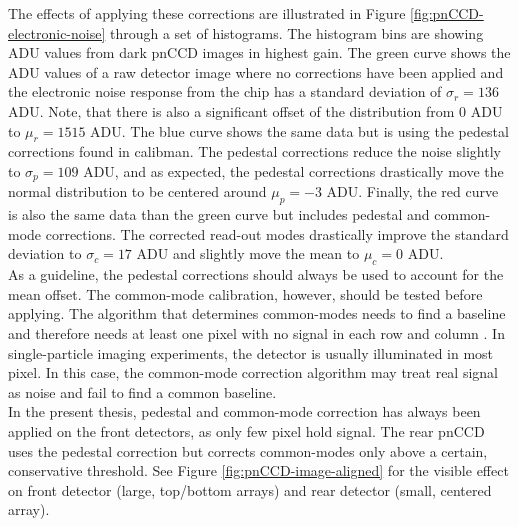 %
The effects of applying these corrections are illustrated in Figure \ref{fig:pnCCD-electronic-noise} through a set of histograms. The histogram bins are showing ADU values from dark pnCCD images in highest gain. The green curve shows the ADU values of a raw detector image where no corrections have been applied and the electronic noise response from the chip has a standard deviation of $\sigma_{r}=136$ ADU. Note, that there is also a significant offset of the distribution from 0 ADU to $\mu_{r}=1515$ ADU. The blue curve shows the same data but is using the pedestal corrections found in calibman. The pedestal corrections reduce the noise slightly to $\sigma_{p}=109$ ADU, and as expected, the pedestal corrections drastically move the normal distribution to be centered around $\mu_{p}=-3$ ADU. Finally, the red curve is also the same data than the green curve but includes pedestal and common-mode corrections. The corrected read-out modes drastically improve the standard deviation to $\sigma_{c}=17$ ADU and slightly move the mean to $\mu_{c}=0$ ADU.\\[1\baselineskip]
%
As a guideline, the pedestal corrections should always be used to account for the mean offset. The common-mode calibration, however, should be tested before applying. The algorithm that determines common-modes needs to find a baseline and therefore needs at least one pixel with no signal in each row and column \citep{Hantke-Foucard-2016-PC}. In single-particle imaging experiments, the detector is usually illuminated in most pixel. In this case, the common-mode correction algorithm may treat real signal as noise and fail to find a common baseline.\\[1\baselineskip]
%
In the present thesis, pedestal and common-mode correction has always been applied on the front detectors, as only few pixel hold signal. The rear pnCCD uses the pedestal correction but corrects common-modes only above a certain, conservative threshold. See Figure \ref{fig:pnCCD-image-aligned} for the visible effect on front detector (large, top/bottom arrays) and rear detector (small, centered array).\\
%
%
%
%
%
%
